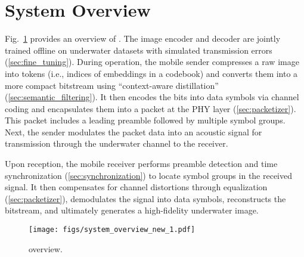 \section{System Overview}
\label{sec:system_overview}
Fig.~\ref{fig:system_overview} provides an overview of \sysname.
The image encoder and decoder are jointly trained offline on underwater datasets with simulated transmission errors (\cref{sec:fine_tuning}).
During operation, the mobile sender compresses
a raw image into tokens (i.e., indices of embeddings in a codebook)
and converts them into a more compact bitstream
using ``context-aware distillation'' (\cref{sec:semantic_filtering}).
It then encodes the bits into data symbols via channel coding and
encapsulates them into a packet at the PHY layer (\cref{sec:packetizer}).
This packet includes a leading preamble followed by multiple symbol groups.
Next, the sender modulates the packet data into an acoustic signal
for transmission through the underwater channel to the receiver.

Upon reception, the mobile receiver performs preamble detection and time synchronization (\cref{sec:synchronization}) to locate symbol groups in the received signal.
It then compensates for channel distortions through equalization (\cref{sec:packetizer}),
demodulates the signal into data symbols,
reconstructs the bitstream,
and ultimately generates a high-fidelity underwater image.

\begin{figure}[t]
    \centering
    \texttt{[image: figs/system\_overview\_new\_1.pdf]}
    \caption{\sysname overview.}
    \label{fig:system_overview}
\end{figure}





